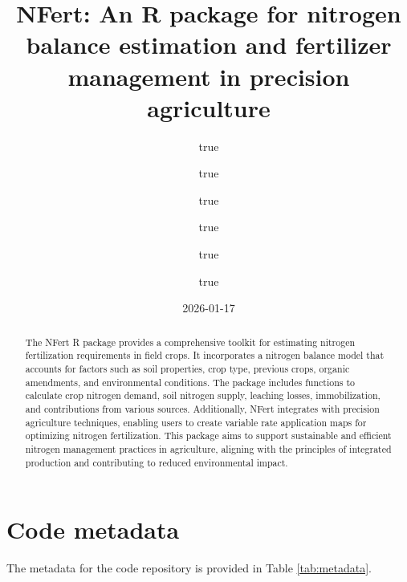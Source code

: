 \documentclass[
  11pt,
]{article}
\title{NFert: An R package for nitrogen balance estimation and
fertilizer management in precision agriculture}
\author{true \and true \and true \and true \and true \and true}
\date{2026-01-17}
\begin{document}
\maketitle
\begin{abstract}
The NFert R package provides a comprehensive toolkit for estimating
nitrogen fertilization requirements in field crops. It incorporates a
nitrogen balance model that accounts for factors such as soil
properties, crop type, previous crops, organic amendments, and
environmental conditions. The package includes functions to calculate
crop nitrogen demand, soil nitrogen supply, leaching losses,
immobilization, and contributions from various sources. Additionally,
NFert integrates with precision agriculture techniques, enabling users
to create variable rate application maps for optimizing nitrogen
fertilization. This package aims to support sustainable and efficient
nitrogen management practices in agriculture, aligning with the
principles of integrated production and contributing to reduced
environmental impact.
\end{abstract}

{
\setcounter{tocdepth}{3}
\tableofcontents
}
\section{Code metadata}\label{code-metadata}

The metadata for the code repository is provided in Table
\ref{tab:metadata}.
\end{document}
